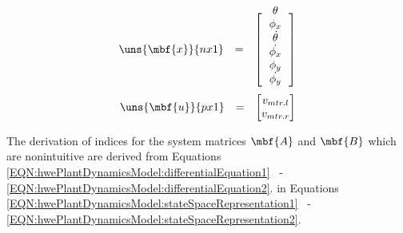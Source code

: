 \documentclass[crop=false,float=true,class=scrreprt]{standalone}
\begin{document}
\begin{equation}
\label{EQN:hwePlantDynamicsModel:stateSpaceRepresentation:states}
\begin{array}{ccccccc}
\uns{\mbf{x}}{n x 1}
& = &
\begin{bmatrix}
\hphantom{v_{mtr.l}}\\[-2em]
\theta         \\
\phi_{x}       \\
\dot{\theta}   \\
\dot{\phi_{x}} \\
\phi_{y}       \\
\dot{\phi_{y}} \\
\end{bmatrix}
\end{array}
\end{equation}
\vspace{+2em}
\begin{equation}
\label{EQN:hwePlantDynamicsModel:stateSpaceRepresentation:inputs}
\begin{array}{ccccccc}
\uns{\mbf{u}}{p x 1}
& = &
\begin{bmatrix}
v_{mtr.l} \\
v_{mtr.r} \\
\end{bmatrix}
\end{array}
\end{equation}




\clearpage




The derivation of indices for the system matrices $\mbf{A}$ and $\mbf{B}$ which are nonintuitive are derived
from Equations
\eqref{EQN:hwePlantDynamicsModel:differentialEquation1}~%
-~%
\eqref{EQN:hwePlantDynamicsModel:differentialEquation2}.
in Equations
\eqref{EQN:hwePlantDynamicsModel:stateSpaceRepresentation1}~%
-~%
\eqref{EQN:hwePlantDynamicsModel:stateSpaceRepresentation2}.


\vspace*{+0em}
\end{document}
